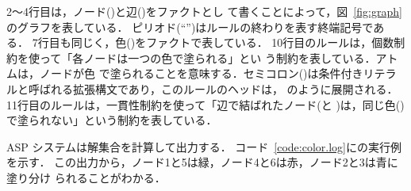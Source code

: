 2〜4行目は，ノード()と辺()をファクトとし
て書くことによって，図~\ref{fig:graph}のグラフを表している．
ピリオド(``'')はルールの終わりを表す終端記号である．
7行目も同じく，色()をファクトで表している．
%
10行目のルールは，個数制約を使って「各ノードは一つの色で塗られる」とい
う制約を表している．アトムは，ノードが色
で塗られることを意味する．セミコロン(\code{:})は条件付きリテラ
ルと呼ばれる拡張構文であり，このルールのヘッドは，
のように展開される．
11行目のルールは，一貫性制約を使って「辺で結ばれたノード(と
)は，同じ色()で塗られない」という制約を表している．

ASP システムは解集合を計算して出力する．
コード~\ref{code:color.log}に{\clingo}の実行例を示す．
この出力から，ノード1と5は緑，ノード4と6は赤，ノード2と3は青に塗り分け
られることがわかる．


